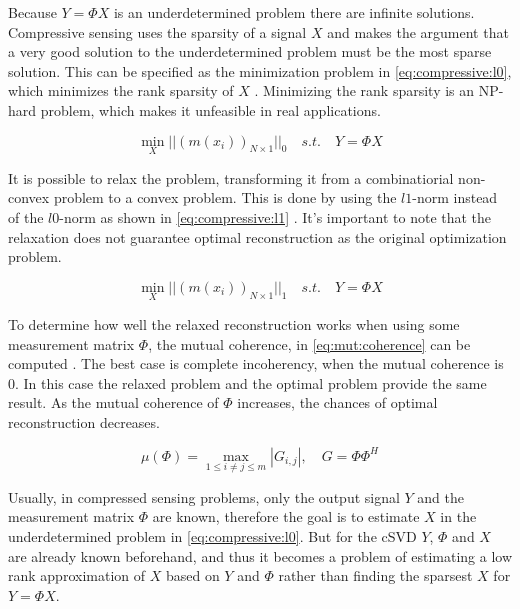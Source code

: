 Because $Y = \Phi X$ is an underdetermined problem there are infinite solutions. Compressive sensing uses the sparsity of a signal $X$ and makes the argument that a very good solution to the underdetermined problem must be the most sparse solution. This can be specified as the minimization problem in \eqref{eq:compressive:l0}, which minimizes the rank sparsity of $X$ \cite{chen:mmv}. Minimizing the rank sparsity is an NP-hard problem, which makes it unfeasible in real applications.

\begin{equation} \label{eq:compressive:l0}
  \min_{X} || (m(x_i))_{N \times 1} ||_0 \quad s.t. \quad Y = \Phi X
\end{equation}

It is possible to relax the problem, transforming it from a combinatiorial non-convex problem to a convex problem. This is done by using the $l1$-norm instead of the $l0$-norm as shown in \eqref{eq:compressive:l1} \cite{chen:mmv}. It's important to note that the relaxation does not guarantee optimal reconstruction as the original optimization problem. 

\begin{equation} \label{eq:compressive:l1}
    \min_{X} || (m(x_i))_{N \times 1} ||_1 \quad s.t. \quad Y = \Phi X
\end{equation}

To determine how well the relaxed reconstruction works when using some measurement matrix $\Phi$, the mutual coherence, in \eqref{eq:mut:coherence} can be computed \cite{chen:mmv}. The best case is complete incoherency, when the mutual coherence is 0. In this case the relaxed problem and the optimal problem provide the same result. As the mutual coherence of $\Phi$ increases, the chances of optimal reconstruction decreases.

\begin{equation} \label{eq:mut:coherence}
    \mu(\Phi) = \max_{1 \le i \neq j \le m} | G_{i,j} |,\quad G = \Phi\Phi^H
\end{equation}

Usually, in compressed sensing problems, only the output signal $Y$ and the measurement matrix $\Phi$ are known, therefore the goal is to estimate $X$ in the underdetermined problem in \eqref{eq:compressive:l0}. But for the cSVD $Y$, $\Phi$ and $X$ are already known beforehand, and thus it becomes a problem of estimating a low rank approximation of $X$ based on $Y$ and $\Phi$ rather than finding the sparsest $X$ for $Y = \Phi X$.

